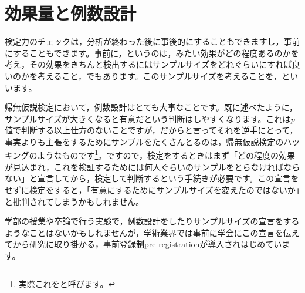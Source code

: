 \documentclass{ltjsarticle}
\begin{document}
\section{効果量と例数設計}
検定力のチェックは，分析が終わった後に事後的にすることもできますし，事前にすることもできます。事前に，というのは，みたい効果がどの程度あるのかを考え，その効果をきちんと検出するにはサンプルサイズをどれぐらいにすれば良いのかを考えること，でもあります。このサンプルサイズを考えることを，といいます。

帰無仮説検定において，例数設計はとても大事なことです。既に述べたように，サンプルサイズが大きくなると有意だという判断はしやすくなります。これは$p$値で判断する以上仕方のないことですが，だからと言ってそれを逆手にとって，事実よりも主張をするためにサンプルをたくさんとるのは，帰無仮説検定のハッキングのようなものです\footnote{実際これをと呼びます。}。ですので，検定をするときはまず「どの程度の効果が見込まれ，これを検証するためには何人ぐらいのサンプルをとらなければならない」と宣言してから，検定して判断するという手続きが必要です。この宣言をせずに検定をすると，「有意にするためにサンプルサイズを変えたのではないか」と批判されてしまうかもしれません。

学部の授業や卒論で行う実験で，例数設計をしたりサンプルサイズの宣言をするようなことはないかもしれませんが，学術業界では事前に学会にこの宣言を伝えてから研究に取り掛かる，事前登録制pre-registrationが導入されはじめています。
\end{document}
